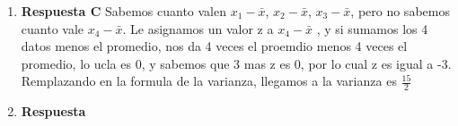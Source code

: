 \documentclass[11pt]{article}
\begin{document}
\begin{enumerate}
    \item \textbf{Respuesta C} Sabemos cuanto valen $x_1-\bar{x}$, $x_2-\bar{x}$, $x_3-\bar{x}$, pero no sabemos cuanto vale $x_4-\bar{x}$. Le asignamos un valor z a $x_4 - \bar{x}$ , y si sumamos los 4 datos menos el promedio, nos da 4 veces el proemdio menos 4 veces el promedio, lo ucla es 0, y sabemos que 3 mas z es 0, por lo cual z es igual a -3. \\ 
Remplazando en la formula de la varianza, llegamos a la varianza es $\frac{15}{2}$ %

    \item \textbf{Respuesta }




\end{enumerate}

\end{document}
